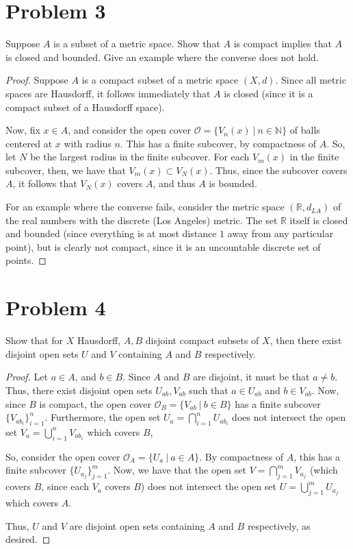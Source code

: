\documentclass[fontsize=11pt]{scrartcl} %
\numberwithin{equation}{section} %
\numberwithin{figure}{section} %
\numberwithin{table}{section} %
\newcommand{\R}{\mathbb{R}}
\newcommand{\N}{\mathbb{N}}
\begin{document}
\section*{Problem 3}
Suppose $A$ is a subset of a metric space. Show that $A$ is compact implies that
$A$ is closed and bounded. Give an example where the converse does not hold.
\\
\begin{proof}
    Suppose $A$ is a compact subset of a metric space $(X,d)$. Since all metric
    spaces are Hausdorff, it follows immediately that $A$ is closed (since it is
    a compact subset of a Hausdorff space).

    Now, fix $x\in A$, and consider the open cover $\mathscr{O} = \{V_n(x)\ |\
    n\in\N\}$ of balls centered at $x$ with radius $n$. This has a finite
    subcover, by compactness of $A$. So, let $N$ be the largest radius in the
    finite subcover. For each $V_m(x)$ in the finite subcover, then, we have
    that $V_m(x)\subset V_N(x)$. Thus, since the subcover covers $A$, it follows
    that $V_N(x)$ covers $A$, and thus $A$ is bounded.

    For an example where the converse fails, consider the metric space
    $(\R,d_{LA})$ of the real numbers with the discrete (Los Angeles) metric.
    The set $\R$ itself is closed and bounded (since everything is at most
    distance $1$ away from any particular point), but is clearly not compact,
    since it is an uncountable discrete set of points.
\end{proof}

\section*{Problem 4}
Show that for $X$ Hausdorff, $A,B$ disjoint compact subsets of $X$, then there
exist disjoint open sets $U$ and $V$ containing $A$ and $B$ respectively.
\\
\begin{proof}
Let $a\in A$, and $b\in B$. Since $A$ and $B$ are disjoint, it must be that
    $a\neq b$. Thus, there exist disjoint open sets $U_{ab},V_{ab}$ such that $a\in
    U_{ab}$ and $b\in V_{ab}$. Now, since $B$ is compact, the open cover
    $\mathscr{O}_B = \{V_{ab}\ |\ b\in B\}$ has a finite subcover
    $\{V_{ab_i}\}_{i=1}^n$. Furthermore, the open set $U_a =
    \bigcap_{i=1}^nU_{ab_i}$ does not intersect the open set $V_a =
    \bigcup_{i=1}^nV_{ab_i}$ which covers $B$,

    So, consider the open cover $\mathscr{O}_A = \{U_a\ |\ a\in A\}$. By
    compactness of $A$, this has a finite subcover $\{U_{a_j}\}_{j=1}^m$. Now,
    we have that the open set $V = \bigcap_{j=1}^mV_{a_j}$ (which covers $B$, since
    each $V_a$ covers $B$) does not intersect the open set $U =
    \bigcup_{j=1}^mU_{a_j}$ which covers $A$.

    Thus, $U$ and $V$ are disjoint open sets containing $A$ and $B$
    respectively, as desired.
\end{proof}
\end{document}
